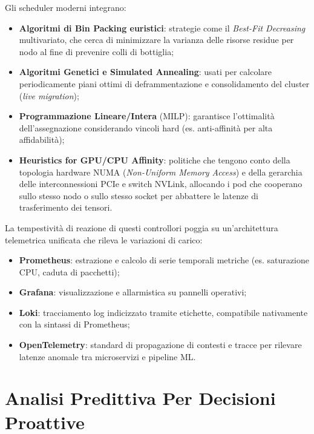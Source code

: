 \documentclass[11pt, a4paper]{article}
\begin{document}
Gli scheduler moderni integrano:
\begin{itemize}
    \item \textbf{Algoritmi di Bin Packing euristici}: strategie come il \emph{Best-Fit Decreasing} multivariato, che cerca di minimizzare la varianza delle risorse residue per nodo al fine di prevenire colli di bottiglia;
    \item \textbf{Algoritmi Genetici e Simulated Annealing}: usati per calcolare periodicamente piani ottimi di deframmentazione e consolidamento del cluster (\emph{live migration});
    \item \textbf{Programmazione Lineare/Intera} (MILP): garantisce l'ottimalità dell'assegnazione considerando vincoli hard (es. anti-affinità per alta affidabilità);
    \item \textbf{Heuristics for GPU/CPU Affinity}: politiche che tengono conto della topologia hardware NUMA (\emph{Non-Uniform Memory Access}) e della gerarchia delle interconnessioni PCIe e switch NVLink, allocando i pod che cooperano sullo stesso nodo o sullo stesso socket per abbattere le latenze di trasferimento dei tensori.
\end{itemize}

La tempestività di reazione di questi controllori poggia su un'architettura telemetrica unificata che rileva le variazioni di carico:
\begin{itemize}
    \item \textbf{Prometheus}: estrazione e calcolo di serie temporali metriche (es. saturazione CPU, caduta di pacchetti);
    \item \textbf{Grafana}: visualizzazione e allarmistica su pannelli operativi;
    \item \textbf{Loki}: tracciamento log indicizzato tramite etichette, compatibile nativamente con la sintassi di Prometheus;
    \item \textbf{OpenTelemetry}: standard di propagazione di contesti e tracce per rilevare latenze anomale tra microservizi e pipeline ML.
\end{itemize}

\newpage


\section{Analisi Predittiva Per Decisioni Proattive}
\end{document}
